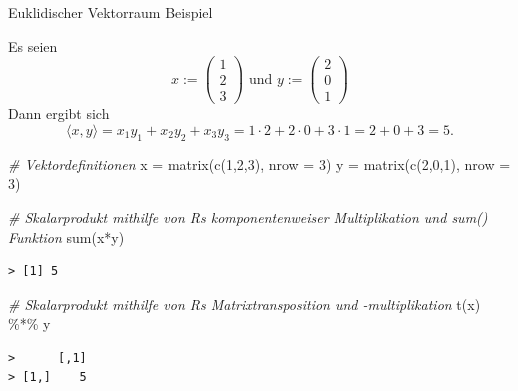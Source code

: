 \documentclass[
  8pt,
  ignorenonframetext,
]{beamer}
\newenvironment{Shaded}{\begin{snugshade}}{\end{snugshade}}
\newcommand{\AttributeTok}[1]{\textcolor[rgb]{0.77,0.63,0.00}{#1}}
\newcommand{\CommentTok}[1]{\textcolor[rgb]{0.56,0.35,0.01}{\textit{#1}}}
\newcommand{\DecValTok}[1]{\textcolor[rgb]{0.00,0.00,0.81}{#1}}
\newcommand{\FunctionTok}[1]{\textcolor[rgb]{0.00,0.00,0.00}{#1}}
\newcommand{\NormalTok}[1]{#1}
\newcommand{\OtherTok}[1]{\textcolor[rgb]{0.56,0.35,0.01}{#1}}
\newcommand{\SpecialCharTok}[1]{\textcolor[rgb]{0.00,0.00,0.00}{#1}}
\begin{document}
\begin{frame}[fragile]{Euklidischer Vektorraum}
\protect\hypertarget{euklidischer-vektorraum-1}{}
Beispiel

\footnotesize

Es seien \begin{equation}
x :=
\begin{pmatrix}
1 \\ 2 \\ 3
\end{pmatrix}
\mbox{ und }
y :=
\begin{pmatrix}
2 \\ 0 \\ 1
\end{pmatrix}
\end{equation} Dann ergibt sich \begin{equation}
\langle x,y \rangle
= x_1y_1 + x_2y_2 + x_3y_3
= 1 \cdot 2 + 2 \cdot 0 + 3 \cdot 1
= 2 + 0 + 3
= 5.
\end{equation} \vspace{2mm} \footnotesize

\begin{Shaded}
\begin{Highlighting}[]
\CommentTok{\# Vektordefinitionen}
\NormalTok{x }\OtherTok{=} \FunctionTok{matrix}\NormalTok{(}\FunctionTok{c}\NormalTok{(}\DecValTok{1}\NormalTok{,}\DecValTok{2}\NormalTok{,}\DecValTok{3}\NormalTok{), }\AttributeTok{nrow =} \DecValTok{3}\NormalTok{)}
\NormalTok{y }\OtherTok{=} \FunctionTok{matrix}\NormalTok{(}\FunctionTok{c}\NormalTok{(}\DecValTok{2}\NormalTok{,}\DecValTok{0}\NormalTok{,}\DecValTok{1}\NormalTok{), }\AttributeTok{nrow =} \DecValTok{3}\NormalTok{)}
\end{Highlighting}
\end{Shaded}

\begin{Shaded}
\begin{Highlighting}[]
\CommentTok{\# Skalarprodukt mithilfe von R\textquotesingle{}s komponentenweiser Multiplikation und sum() Funktion}
\FunctionTok{sum}\NormalTok{(x}\SpecialCharTok{*}\NormalTok{y)}
\end{Highlighting}
\end{Shaded}

\begin{verbatim}
> [1] 5
\end{verbatim}

\begin{Shaded}
\begin{Highlighting}[]
\CommentTok{\# Skalarprodukt mithilfe von R\textquotesingle{}s Matrixtransposition und {-}multiplikation}
\FunctionTok{t}\NormalTok{(x) }\SpecialCharTok{\%*\%}\NormalTok{ y}
\end{Highlighting}
\end{Shaded}

\begin{verbatim}
>      [,1]
> [1,]    5
\end{verbatim}
\end{frame}
\end{document}
